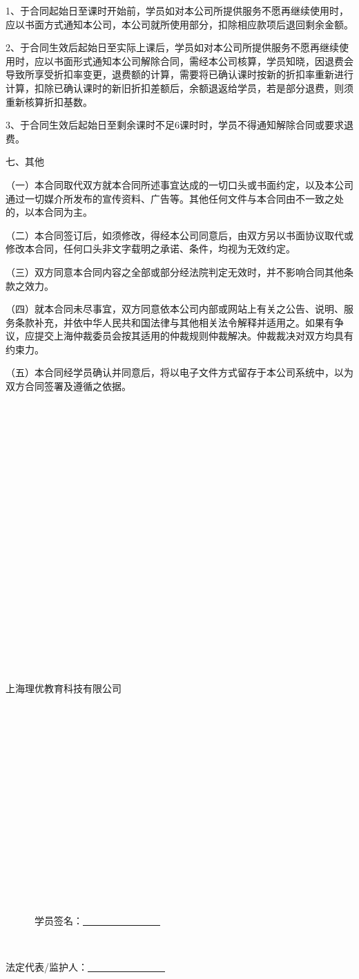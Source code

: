 \documentclass {ctexart}
\begin{document}
1、于合同起始日至课时开始前，学员如对本公司所提供服务不愿再继续使用时，应以书面方式通知本公司，本公司就所使用部分，扣除相应款项后退回剩余金额。


2、于合同生效后起始日至实际上课后，学员如对本公司所提供服务不愿再继续使用时，应以书面形式通知本公司解除合同，需经本公司核算，学员知晓，因退费会导致所享受折扣率变更，退费额的计算，需要将已确认课时按新的折扣率重新进行计算，扣除已确认课时的新旧折扣差额后，余额退返给学员，若是部分退费，则须重新核算折扣基数。


3、于合同生效后起始日至剩余课时不足6课时时，学员不得通知解除合同或要求退费。

\newpage

七、其他


（一）本合同取代双方就本合同所述事宜达成的一切口头或书面约定，以及本公司通过一切媒介所发布的宣传资料、广告等。其他任何文件与本合同由不一致之处的，以本合同为主。


（二）本合同签订后，如须修改，得经本公司同意后，由双方另以书面协议取代或修改本合同，任何口头非文字载明之承诺、条件，均视为无效约定。


（三）双方同意本合同内容之全部或部分经法院判定无效时，并不影响合同其他条款之效力。


（四）就本合同未尽事宜，双方同意依本公司内部或网站上有关之公告、说明、服务条款补充，并依中华人民共和国法律与其他相关法令解释并适用之。如果有争议，应提交上海仲裁委员会按其适用的仲裁规则仲裁解决。仲裁裁决对双方均具有约束力。


（五）本合同经学员确认并同意后，将以电子文件方式留存于本公司系统中，以为双方合同签署及遵循之依据。


　
\begin{multicols}{2}

　　
 

　　

　　
 
　　
 

　　
 

　　
 
　　
 

　　
 

　　
 
　　
 

　　
 


上海理优教育科技有限公司　　　　　　　　




　　
 
　　
　　
 
　　
 

　　
 
 
　　
 

　　
 
　　
 

　　
 
　　　　

　　　学员签名：\underline{　　　　　　　　}




　　　　

法定代表/监护人：\underline{　　　　　　　　}

　　　　

　　　　


\end{multicols}
\end{document}
